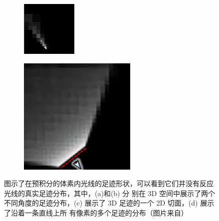 \begin{figure}
\begin{subfigure}[b]{0.243\textwidth}
		\caption{}
	\end{subfigure}
	\begin{subfigure}[b]{0.243\textwidth}
		\includegraphics[width=\textwidth]{figures/vct/vct-8-3}
		\caption{}
	\end{subfigure}
	\begin{subfigure}[b]{0.243\textwidth}
		\includegraphics[width=\textwidth]{figures/vct/vct-8-4}
		\caption{}
	\end{subfigure}
	\caption{图示了在预积分的体素内光线的足迹形状，可以看到它们并没有反应光线的真实足迹分布，其中，(a)和(b) 分 别在 3D 空间中展示了两个不同角度的足迹分布，(c) 展示了 3D 足迹的一个 2D 切面，(d) 展示了沿着一条直线上所 有像素的多个足迹的分布（图片来自\cite{a:InteractiveIndirectIlluminationUsingVoxelConeTracing}）}
	\label{f:vct-8}
\end{figure}
